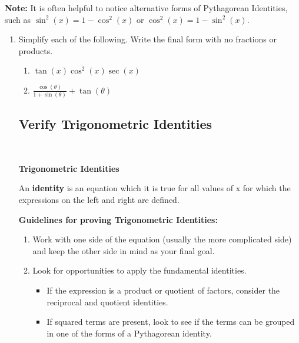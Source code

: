 {\bf Note:} It is often helpful to notice alternative forms of
Pythagorean Identities, such as $\sin^2(x) = 1-\cos^2(x)$ or
$\cos^2(x) = 1-\sin^2(x)$.




\begin{enumerate}
\vspace{-.1in}
\item Simplify each of the following. Write the final form with no fractions or products.

\begin{enumerate}
\item $\tan(x) \cos^2(x) \sec(x)$
\vfill


\newpage

\item $\displaystyle \frac{\cos (\theta)}{1+\sin (\theta)}+\tan (\theta)$
\vfill


\end{enumerate}

\subsection{Verify Trigonometric Identities} ~

\begin{boxthm}
{\bf Trigonometric Identities}

An {\bf identity} is an equation which it is true for all values of x for which the expressions on the left and right are defined.

\vspace{0.5cm}

{\bf Guidelines for proving Trigonometric Identities:}
\begin{enumerate}
\item Work with one side of the equation (usually the more complicated side) and keep the other side in mind as your final goal.

\item Look for opportunities to apply the fundamental identities.

\begin{itemize}

\item If the expression is a product or quotient of factors, consider the reciprocal and quotient identities.

\item If squared terms are present, look to see if the terms can be grouped in one of the forms of a Pythagorean identity.


\end{itemize}
\end{enumerate}
\end{boxthm}
\end{enumerate}
